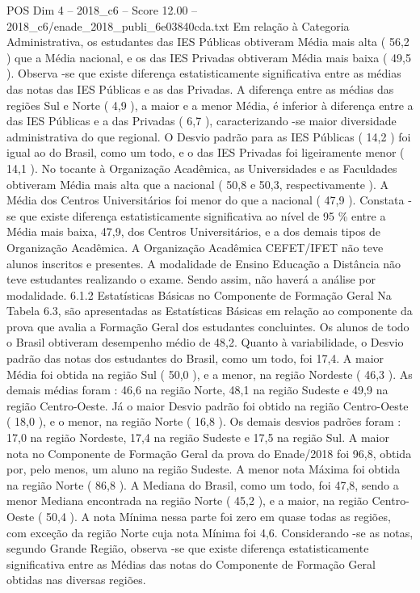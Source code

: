 \begin{textsample}{POS Dim 4 – 2018\_c6 – Score 12.00 – 2018\_c6/enade\_2018\_publi\_6e03840cda.txt}
Em relação à Categoria Administrativa, os estudantes das IES Públicas obtiveram Média mais alta ( 56,2 ) que a Média nacional, e os das IES Privadas obtiveram Média mais baixa ( 49,5 ).
Observa -se que existe diferença estatisticamente significativa entre as médias das notas das IES Públicas e as das Privadas.
A diferença entre as médias das regiões Sul e Norte ( 4,9 ), a maior e a menor Média, é inferior à diferença entre a das IES Públicas e a das Privadas ( 6,7 ), caracterizando -se maior diversidade administrativa do que regional.
O Desvio padrão para as IES Públicas ( 14,2 ) foi igual ao do Brasil, como um todo, e o das IES Privadas foi ligeiramente menor ( 14,1 ).
No tocante à Organização Acadêmica, as Universidades e as Faculdades obtiveram Média mais alta que a nacional ( 50,8 e 50,3, respectivamente ).
A Média dos Centros Universitários foi menor do que a nacional ( 47,9 ).
Constata -se que existe diferença estatisticamente significativa ao nível de 95 \% entre a Média mais baixa, 47,9, dos Centros Universitários, e a dos demais tipos de Organização Acadêmica.
A Organização Acadêmica CEFET/IFET não teve alunos inscritos e presentes.
A modalidade de Ensino Educação a Distância não teve estudantes realizando o exame.
Sendo assim, não haverá a análise por modalidade. 6.1.2 Estatísticas Básicas no Componente de Formação Geral Na Tabela 6.3, são apresentadas as Estatísticas Básicas em relação ao componente da prova que avalia a Formação Geral dos estudantes concluintes.
Os alunos de todo o Brasil obtiveram desempenho médio de 48,2.
Quanto à variabilidade, o Desvio padrão das notas dos estudantes do Brasil, como um todo, foi 17,4.
A maior Média foi obtida na região Sul ( 50,0 ), e a menor, na região Nordeste ( 46,3 ).
As demais médias foram : 46,6 na região Norte, 48,1 na região Sudeste e 49,9 na região Centro-Oeste.
Já o maior Desvio padrão foi obtido na região Centro-Oeste ( 18,0 ), e o menor, na região Norte ( 16,8 ).
Os demais desvios padrões foram : 17,0 na região Nordeste, 17,4 na região Sudeste e 17,5 na região Sul.
A maior nota no Componente de Formação Geral da prova do Enade/2018 foi 96,8, obtida por, pelo menos, um aluno na região Sudeste.
A menor nota Máxima foi obtida na região Norte ( 86,8 ).
A Mediana do Brasil, como um todo, foi 47,8, sendo a menor Mediana encontrada na região Norte ( 45,2 ), e a maior, na região Centro-Oeste ( 50,4 ).
A nota Mínima nessa parte foi zero em quase todas as regiões, com exceção da região Norte cuja nota Mínima foi 4,6.
Considerando -se as notas, segundo Grande Região, observa -se que existe diferença estatisticamente significativa entre as Médias das notas do Componente de Formação Geral obtidas nas diversas regiões.

\end{textsample}
